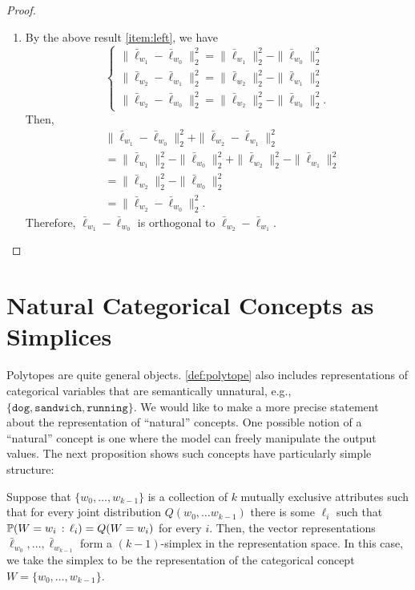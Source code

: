 \documentclass{article}
\newcommand{\ConceptValue}[1]{\texttt{#1}}
\begin{document}
\begin{proof}
\begin{enumerate}[label=(\alph*)]
    \item By the above result \ref{item:left}, we have
    \begin{equation}
      \begin{cases}
        \|\bar\ell_{w_1} - \bar\ell_{w_0}\|_2^2 = \|\bar\ell_{w_1}\|_2^2  - \|\bar\ell_{w_0}\|_2^2\\
        \|\bar\ell_{w_2} - \bar\ell_{w_1}\|_2^2 = \|\bar\ell_{w_2}\|_2^2  - \|\bar\ell_{w_1}\|_2^2\\
        \|\bar\ell_{w_2} - \bar\ell_{w_0}\|_2^2 = \|\bar\ell_{w_2}\|_2^2  - \|\bar\ell_{w_0}\|_2^2.
      \end{cases}
    \end{equation}
    Then,
    \begin{align}
      &\|\bar\ell_{w_1} - \bar\ell_{w_0}\|_2^2 + \|\bar\ell_{w_2} - \bar\ell_{w_1}\|_2^2\\
      &= \|\bar\ell_{w_1}\|_2^2  - \|\bar\ell_{w_0}\|_2^2 + \|\bar\ell_{w_2}\|_2^2  - \|\bar\ell_{w_1}\|_2^2\\
      &= \|\bar\ell_{w_2}\|_2^2  - \|\bar\ell_{w_0}\|_2^2\\
      & = \|\bar\ell_{w_2} - \bar\ell_{w_0}\|_2^2.
    \end{align}
    Therefore, $\bar\ell_{w_1} - \bar\ell_{w_0}$ is orthogonal to $\bar\ell_{w_2} - \bar\ell_{w_1}$.
  \end{enumerate}
\end{proof}


\section{Natural Categorical Concepts as Simplices}\label{sec:simplex}
Polytopes are quite general objects. \cref{def:polytope} also includes representations of categorical variables that are semantically unnatural, e.g., $\{\ConceptValue{dog}, \ConceptValue{sandwich}, \ConceptValue{running}\}$. We would like to make a more precise statement about the representation of ``natural'' concepts. One possible notion of a ``natural'' concept is one where the model can freely manipulate the output values. The next proposition shows such concepts have particularly simple structure: 
\begin{proposition}\label{thm:simplex}
  Suppose that $\{w_0, \dots, w_{k-1}\}$ is a collection of $k$ mutually exclusive attributes such that for every joint distribution $Q(w_0, \dots w_{k-1})$ there is some $\ell_{i}$ such that $\Pr(W = w_i \given \ell_{i}) = Q(W=w_i)$ for every $i$.
  Then, the vector representations $\bar\ell_{w_0}, \dots, \bar\ell_{w_{k-1}}$ form a $(k-1)$-simplex in the representation space. In this case, we take the simplex to be the representation of the categorical concept $W = \{w_0, \dots, w_{k-1}\}$.
\end{proposition}
\end{document}
